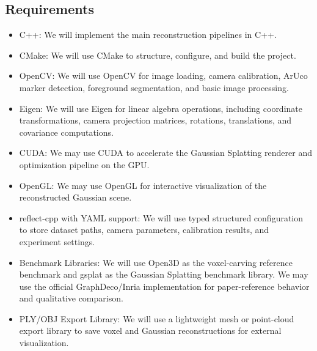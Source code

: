 \subsection{Requirements}
\begin{itemize}
\setlength{\itemsep}{0.5em}

\item C++: We will implement the main reconstruction pipelines in C++.

\item CMake: We will use CMake to structure, configure, and build the project.

\item OpenCV: We will use OpenCV for image loading, camera calibration, ArUco marker detection, foreground segmentation, and basic image processing.

\item Eigen: We will use Eigen for linear algebra operations, including coordinate transformations, camera projection matrices, rotations, translations, and covariance computations.

\item CUDA: We may use CUDA to accelerate the Gaussian Splatting renderer and optimization pipeline on the GPU.

\item OpenGL: We may use OpenGL for interactive visualization of the reconstructed Gaussian scene.

\item reflect-cpp with YAML support: We will use typed structured configuration to store dataset paths, camera parameters, calibration results, and experiment settings.

\item Benchmark Libraries: We will use Open3D as the voxel-carving reference benchmark and gsplat as the Gaussian Splatting benchmark library. We may use the official GraphDeco/Inria implementation for paper-reference behavior and qualitative comparison.

\item PLY/OBJ Export Library: We will use a lightweight mesh or point-cloud export library to save voxel and Gaussian reconstructions for external visualization.

\end{itemize}
